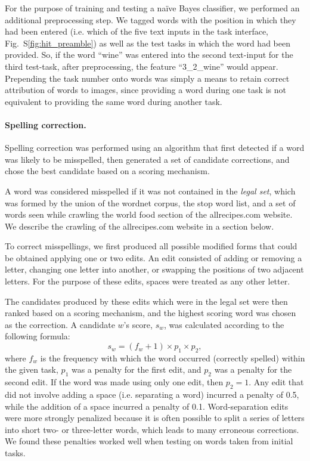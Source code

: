 \documentclass[12pt]{article}
\begin{document}
	For the purpose of training and testing a na\"ive Bayes classifier, we 
	performed an additional preprocessing step.  We tagged words with the
	position in which they had been entered (i.e. which of the five text 
	inputs in the task interface, Fig.~S\ref{fig:hit_preamble}) 
	as well as the test tasks in which the word had been provided.
	So, if the word ``wine'' was entered into the second text-input for 
	the third test-task, after preprocessing, the feature ``3\_2\_wine'' would
	appear.  Prepending the task number onto words was simply a means to 
	retain correct attribution of words to images, since providing a word 
	during one task 
	is not equivalent to providing the same word during another task.  
	
	\paragraph{Spelling correction.}  
	Spelling correction was performed using an algorithm that first detected
	if a word was likely to be misspelled, then generated a set of candidate 
	corrections, and chose the best candidate based on a scoring mechanism.
	
	A word was considered misspelled if it was not contained in the 
	\textit{legal set}, which was formed by the union of
	the wordnet corpus, the stop word list, and a set of words seen while 
	crawling the world food section of the allrecipes.com website.  We
	describe the crawling of the allrecipes.com website in a section below.

	To correct misspellings, we first produced all possible modified forms 
	that could be obtained applying one or two edits.  An edit consisted of 
	adding or removing a letter, changing one letter into another, or 
	swapping the positions of two adjacent letters.  For the purpose of these 
	edits, spaces were treated as any other letter.

	The candidates produced by these edits which were in the legal set were
	then ranked based on a scoring mechanism, and the highest scoring word
	was chosen as the correction.  A candidate $w$'s score, $s_w$, was 
	calculated according to the following formula:
	\begin{equation}
		s_w = (f_w + 1) \times p_1 \times p_2,
	\end{equation}
	where $f_w$ is the frequency with which the word occurred (correctly 
	spelled)
	within the given task, $p_1$ was a penalty for the first edit, and
	$p_2$ was a penalty for the second edit.  If the word was made using only
	one edit, then $p_2 = 1$.  Any edit that did not involve adding a space
	(i.e. separating a word) incurred a penalty of 0.5, while the addition of
	a space incurred a penalty of 0.1.  Word-separation edits were more 
	strongly penalized because it is often possible to split a series of 
	letters into short two- or three-letter words, which leads 
	to many erroneous corrections.  We found these penalties worked well when
	testing on words taken from initial tasks.
\end{document}
